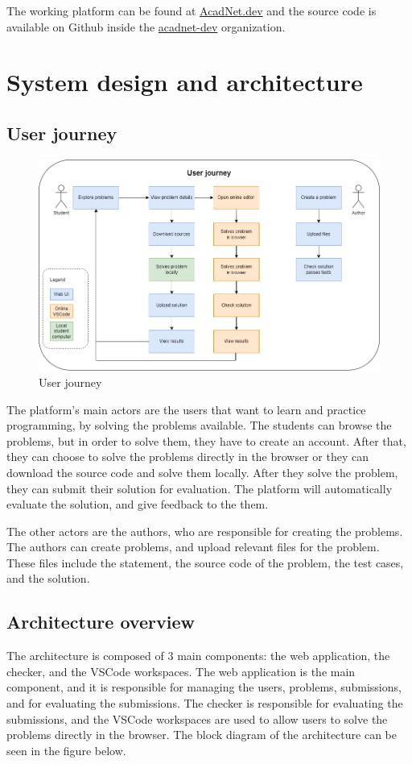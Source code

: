 \documentclass[12pt,a4paper]{report}
\begin{document}
The working platform can be found at \href{https://acadnet.dev}{AcadNet.dev} and the source code is available on Github inside the \href{https://github.com/acadnet-dev}{acadnet-dev} organization.


\chapter{System design and architecture}
\section{User journey}
\begin{figure}[h]
	\centering
	\includegraphics[width=\linewidth]{../photos/user-journey.png}
	\caption{User journey}
	\label{fig:user-journey}
\end{figure}

The platform's main actors are the users that want to learn and practice programming, by solving the problems available. The students can browse the problems, but in order to solve them, they have to create an account. After that, they can choose to solve the problems directly in the browser or they can download the source code and solve them locally. After they solve the problem, they can submit their solution for evaluation. The platform will automatically evaluate the solution, and give feedback to the them.

The other actors are the authors, who are responsible for creating the problems. The authors can create problems, and upload relevant files for the problem. These files include the statement, the source code of the problem, the test cases, and the solution.

\section{Architecture overview}
The architecture is composed of 3 main components: the web application, the checker, and the VSCode workspaces. The web application is the main component, and it is responsible for managing the users, problems, submissions, and for evaluating the submissions. The checker is responsible for evaluating the submissions, and the VSCode workspaces are used to allow users to solve the problems directly in the browser. The block diagram of the architecture can be seen in the figure below.
\end{document}
